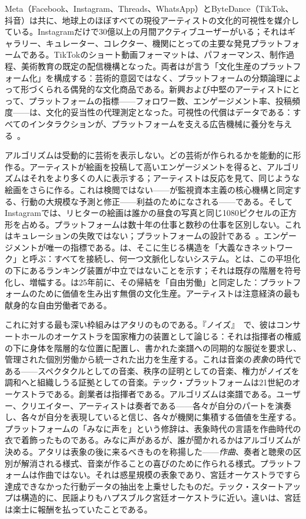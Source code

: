 \documentclass[10pt,letterpaper,twocolumn]{article}
\begin{document}
Meta（Facebook、Instagram、Threads、WhatsApp）とByteDance（TikTok、抖音）は共に、地球上のほぼすべての現役アーティストの文化的可視性を媒介している。Instagramだけで30億以上の月間アクティブユーザーがいる；それはギャラリー、キュレーター、コレクター、機関にとっての主要な発見プラットフォームである。TikTokのショート動画フォーマットは、パフォーマンス、制作過程、美術教育の既定の配信機構となった。両者は\citet{nieborg2018platformization}が言う「文化生産のプラットフォーム化」を構成する：芸術的意図ではなく、プラットフォームの分類論理によって形づくられる偶発的な文化商品である。新興および中堅のアーティストにとって、プラットフォームの指標——フォロワー数、エンゲージメント率、投稿頻度——は、文化的妥当性の代理測定となった。可視性の代償はデータである：すべてのインタラクションが、プラットフォームを支える広告機械に養分を与える~\citep{zuboff2019surveillance, srnicek2017platform}。

アルゴリズムは受動的に芸術を表示しない。どの芸術が作られるかを能動的に形作る。アーティストが絵画を投稿して高いエンゲージメントを得ると、アルゴリズムはそれをより多くの人に表示する；アーティストは反応を見て、同じような絵画をさらに作る。これは検閲ではない——\citet{zuboff2019surveillance}が監視資本主義の核心機構と同定する、行動の大規模な予測と修正——利益のためになされる——である。そしてInstagramでは、リヒターの絵画は誰かの昼食の写真と同じ1080ピクセルの正方形を占める。プラットフォームは数十年の仕事と数秒の仕事を区別しない。これはキュレーションの失敗ではない；プラットフォームの設計である~\citep{chun2016updating}。エンゲージメントが唯一の指標である。\citet{lovink2011networks}は、そこに生じる構造を「大義なきネットワーク」と呼ぶ：すべてを接続し、何一つ文脈化しないシステム。\citet{noble2018algorithms}と\citet{benjamin2019race}は、この平坦化の下にあるランキング装置が中立ではないことを示す；それは既存の階層を符号化し、増幅する。\citet{terranova2000free}は25年前に、その帰結を「自由労働」と同定した：プラットフォームのために価値を生み出す無償の文化生産。アーティストは注意経済の最も献身的な自由労働者である。

これに対する最も深い枠組みはアタリのものである。『ノイズ』~\citep{attali1985noise}で、彼はコンサートホールのオーケストラを国家権力の装置として論じる：それは指揮者の権威の下に身体を階層的な位置に配置し、書かれた楽譜への同期的な服従を要求し、管理された個別労働から統一された出力を生産する。これは音楽の\emph{表象}の時代である——スペクタクルとしての音楽、秩序の証明としての音楽、権力がノイズを調和へと組織しうる証拠としての音楽。テック・プラットフォームは21世紀のオーケストラである。創業者は指揮者である。アルゴリズムは楽譜である。ユーザー、クリエイター、アーティストは奏者である——各々が自分のパートを演奏し、各々が自分を表現していると信じ、各々が機関に集積する価値を生産する。プラットフォームの「みなに声を」という修辞は、表象時代の言語を作曲時代の衣で着飾ったものである。みなに声があるが、誰が聞かれるかはアルゴリズムが決める。アタリは表象の後に来るべきものを称揚した——\emph{作曲}、奏者と聴衆の区別が解消される様式、音楽が作ることの喜びのために作られる様式。プラットフォームは作曲ではない。それは惑星規模の表象であり、宮廷オーケストラですら達成できなかった行動データの抽出を上乗せしたものだ。テック・スタートアップは構造的に、民謡よりもハプスブルク宮廷オーケストラに近い。違いは、宮廷は楽士に報酬を払っていたことである。
\end{document}
